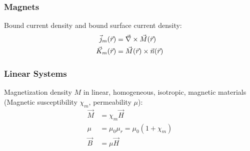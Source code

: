 		\subsubsection{Magnets}
			\noindent
			Bound current density and bound surface current density:
			\begin{equation}
				\begin{aligned}
					\vec{j}_m(\vec{r}) &= \vec{\nabla}\times\vec{M}(\vec{r}) \\
					\vec{K}_m(\vec{r}) &= \vec{M}(\vec{r})\times \vec{n}(\vec{r}) \\
				\end{aligned}
			\end{equation}

		\subsubsection{Linear Systems}
			\noindent
			Magnetization density $M$ in linear, homogeneous, isotropic, magnetic materials (Magnetic susceptibility $\chi_m$, permeability $\mu$):
			\begin{equation}
				\begin{aligned}
					\vec{M} &= \chi_m\vec{H} \\
					\mu &= \mu_0 \mu_r = \mu_0(1+\chi_m) \\
					\vec{B} &= \mu \vec{H} \\
				\end{aligned}
			\end{equation}
